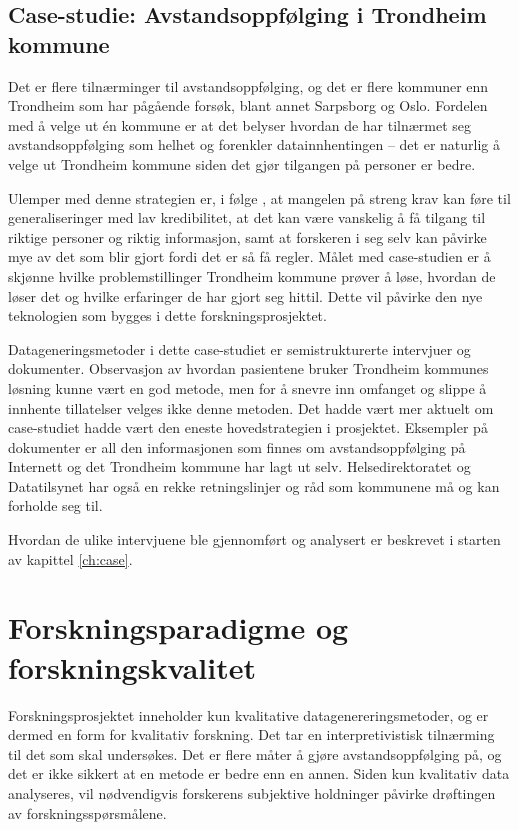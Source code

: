 \subsection{Case-studie: Avstandsoppfølging i Trondheim kommune}
Det er flere tilnærminger til avstandsoppfølging, og det er flere kommuner enn Trondheim som har pågående forsøk, blant annet
Sarpsborg og Oslo. Fordelen med å velge ut én kommune er at det belyser hvordan de har tilnærmet seg avstandsoppfølging
som helhet og forenkler datainnhentingen -- det er naturlig å velge ut Trondheim kommune siden det gjør tilgangen på personer er bedre.

Ulemper med denne strategien er, i følge \citet{oates}, at mangelen på streng krav kan føre til generaliseringer med
lav kredibilitet, at det kan være
vanskelig å få tilgang til riktige personer og riktig informasjon, samt at forskeren i seg selv kan påvirke mye av det som blir gjort fordi det er
så få regler. Målet med case-studien er å skjønne hvilke problemstillinger Trondheim kommune prøver å løse, hvordan de løser det og hvilke
erfaringer de har gjort seg hittil. Dette vil påvirke den nye teknologien som bygges i dette forskningsprosjektet.

Datageneringsmetoder i dette case-studiet er semistrukturerte intervjuer og dokumenter. Observasjon av hvordan pasientene bruker Trondheim kommunes løsning
kunne vært en god metode, men for å snevre inn omfanget og slippe å innhente tillatelser velges ikke denne metoden. Det hadde vært mer
aktuelt om case-studiet hadde vært den eneste hovedstrategien i prosjektet. Eksempler på dokumenter er all den informasjonen som finnes om
avstandsoppfølging på Internett og det Trondheim kommune har lagt ut selv. Helsedirektoratet og Datatilsynet
har også en rekke retningslinjer og råd som kommunene må og kan forholde seg til.

Hvordan de ulike intervjuene ble gjennomført og analysert er beskrevet i starten av kapittel \ref{ch:case}.

\section{Forskningsparadigme og forskningskvalitet}
Forskningsprosjektet inneholder kun kvalitative datagenereringsmetoder, og er dermed en form for kvalitativ forskning.
Det tar en interpretivistisk tilnærming til det som skal undersøkes. Det er flere måter å gjøre avstandsoppfølging på,
og det er ikke sikkert at en metode er bedre enn en annen.
Siden kun kvalitativ data analyseres, vil nødvendigvis forskerens subjektive holdninger påvirke drøftingen av forskningsspørsmålene.

